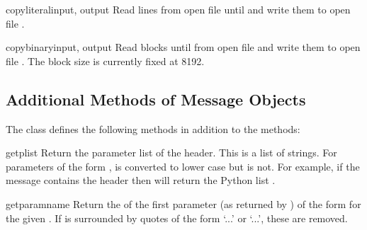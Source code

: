 \begin{funcdesc}{copyliteral}{input, output}
Read lines from open file  until \EOF{} and write them to
open file .
\end{funcdesc}

\begin{funcdesc}{copybinary}{input, output}
Read blocks until \EOF{} from open file  and write them to
open file .  The block size is currently fixed at 8192.
\end{funcdesc}


\begin{seealso}
\end{seealso}


\subsection{Additional Methods of Message Objects
            \label{mimetools-message-objects}}

The  class defines the following methods in
addition to the  methods:

\begin{methoddesc}{getplist}{}
Return the parameter list of the  header.
This is a list of strings.  For parameters of the form
,  is converted to lower case but
 is not.  For example, if the message contains the header
 then
 will return the Python list \code{['spam=1',
'spam=2', 'Spam']}.
\end{methoddesc}

\begin{methoddesc}{getparam}{name}
Return the  of the first parameter (as returned by
) of the form  for the
given .  If  is surrounded by quotes of the form
`\code{<}...\code{>}' or `...', these are removed.
\end{methoddesc}

